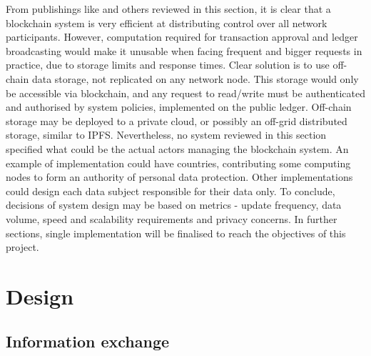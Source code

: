 \documentclass[12pt]{article}
\begin{document}
    From publishings like \cite{dlt} and others reviewed in this section, it is clear that a blockchain system is very efficient at distributing control over all network participants. However, computation required for transaction approval and ledger broadcasting would make it unusable when facing frequent and bigger requests in practice, due to storage limits and response times. Clear solution is to use off-chain data storage, not replicated on any network node. This storage would only be accessible via blockchain, and any request to read/write must be authenticated and authorised by system policies, implemented on the public ledger. Off-chain storage may be deployed to a private cloud, or possibly an off-grid distributed storage, similar to IPFS\cite{ipfs}. Nevertheless, no system reviewed in this section specified what could be the actual actors managing the blockchain system. An example of implementation could have countries, contributing some computing nodes to form an authority of personal data protection. Other implementations could design each data subject responsible for their data only. To conclude, decisions of system design may be based on metrics - update frequency, data volume, speed and scalability requirements and privacy concerns. In further sections, single implementation will be finalised to reach the objectives of this project.


    \section{Design}

    \subsection{Information exchange}
    \label{subsec:design:exchange}
\end{document}
